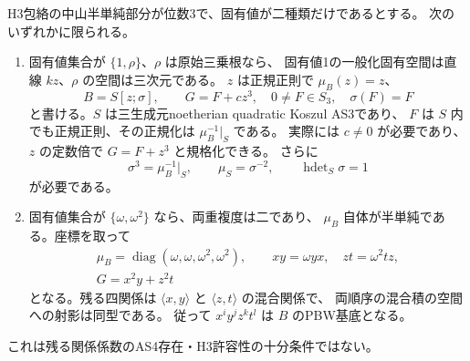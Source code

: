 \begin{theorem}
\label{thm:h3-order3-two-blocks}
H3包絡の中山半単純部分が位数3で、固有値が二種類だけであるとする。
次のいずれかに限られる。
\begin{enumerate}
\item 固有値集合が $\{1,\rho\}$、$\rho$ は原始三乗根なら、
固有値1の一般化固有空間は直線 $kz$、$\rho$ の空間は三次元である。
$z$ は正規正則で $\mu_B(z)=z$、
\[
 B=S[z;\sigma],\qquad G=F+c z^3,
 \quad 0\ne F\in S_3,\quad \sigma(F)=F
\]
と書ける。$S$ は三生成元noetherian quadratic Koszul AS3であり、
$F$ は $S$ 内でも正規正則、その正規化は $\mu_B^{-1}|_S$ である。
実際には $c\ne0$ が必要であり、$z$ の定数倍で $G=F+z^3$ と規格化できる。
さらに
\[
 \sigma^3=\mu_B^{-1}|_S,\qquad \mu_S=\sigma^{-2},\qquad
 \operatorname{hdet}_S\sigma=1
\]
が必要である。
\item 固有値集合が $\{\omega,\omega^2\}$ なら、両重複度は二であり、
$\mu_B$ 自体が半単純である。座標を取って
\[
 \begin{gathered}
 \mu_B=\operatorname{diag}(\omega,\omega,\omega^2,\omega^2),\qquad
 xy=\omega yx,\quad zt=\omega^2tz,\\
 G=x^2y+z^2t
 \end{gathered}
\]
となる。残る四関係は $\langle x,y\rangle$ と $\langle z,t\rangle$ の混合関係で、
両順序の混合積の空間への射影は同型である。
従って $x^iy^jz^kt^l$ は $B$ のPBW基底となる。
\end{enumerate}
これは残る関係係数のAS4存在・H3許容性の十分条件ではない。
\end{theorem}
